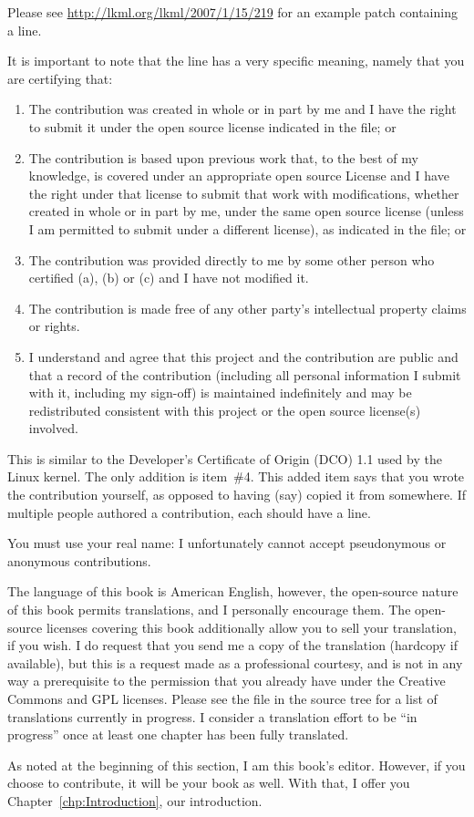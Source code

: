 \begin{quote}
	{ \scriptsize
	}
\end{quote}

Please see \url{http://lkml.org/lkml/2007/1/15/219} for an example
patch containing a  line.

It is important to note that the  line has
a very specific meaning, namely that you are certifying that:

\begin{enumerate}
\item	The contribution was created in whole or in part
	by me and I have the right to submit it under
	the open source license indicated in the file; or
\item	The contribution is based upon previous work
	that, to the best of my knowledge, is covered
	under an appropriate open source License and I
	have the right under that license to submit that
	work with modifications, whether created in whole
	or in part by me, under the same open source
	license (unless I am permitted to submit under
	a different license), as indicated in the file; or
\item	The contribution was provided directly to me by
	some other person who certified (a), (b) or (c)
	and I have not modified it.
\item	The contribution is made free of any other party's
	intellectual property claims or rights.
\item	I understand and agree that this project and the
	contribution are public and that a record of the
	contribution (including all personal information
	I submit with it, including my sign-off) is
	maintained indefinitely and may be redistributed
	consistent with this project or the open source
	license(s) involved.
\end{enumerate}

This is similar to the Developer's Certificate of Origin (DCO) 1.1 used
by the Linux kernel.
The only addition is item~\#4.
This added item says that you wrote the contribution yourself, as opposed
to having (say) copied it from somewhere.
If multiple people authored a contribution, each should have a
 line.

You must use your real name:  I unfortunately cannot accept pseudonymous or
anonymous contributions.

The language of this book is American English, however, the open-source
nature of this book permits translations, and I personally encourage them.
The open-source licenses covering this book additionally allow you
to sell your translation, if you wish.
I do request that you send me a copy of the translation (hardcopy if
available), but this is a request made as a professional courtesy,
and is not in any way a prerequisite to the permission that you already
have under the Creative Commons and GPL licenses.
Please see the  file in the source tree for a list of
translations currently in progress.
I consider a translation effort to be ``in progress'' once at least one
chapter has been fully translated.

As noted at the beginning of this section, I am this book's editor.
However, if you choose to contribute, it will be your book as well.
With that, I offer you Chapter~\ref{chp:Introduction}, our introduction.
